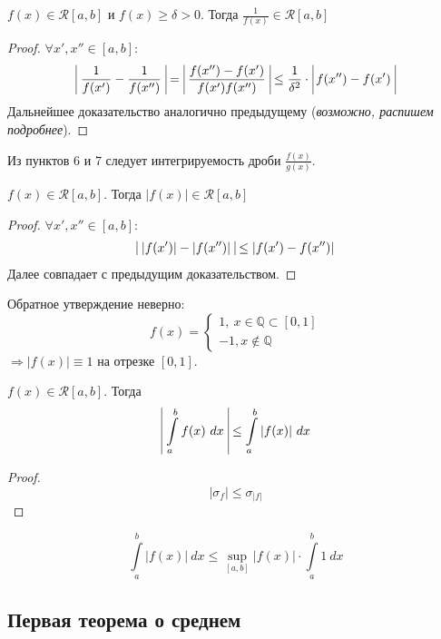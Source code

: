\begin{numtheorem}
    $f(x) \in \mathcal{R}[a, b]$ и $f(x) \geq \delta > 0$. Тогда $\frac{1}{f(x)} \in \mathcal{R}[a, b]$
\end{numtheorem}
\begin{proof}
    $\forall x', x'' \in [a, b]$:
    \begin{align*}
        \vline\ \frac{1}{f(x')} - \frac{1}{f(x'')}\ \vline =\ \vline \frac{f(x'') - f(x')}{f(x')f(x'')}\ \vline \leq \frac{1}{\delta^2}\cdot\ \vline f(x'')-f(x')\ \vline
    \end{align*}
    Дальнейшее доказательство аналогично предыдущему (\textit{возможно, распишем подробнее}).
\end{proof}
\begin{consequense}
    Из пунктов 6 и 7 следует интегрируемость дроби $\frac{f(x)}{g(x)}$.
\end{consequense}
\begin{numtheorem}
    $f(x) \in \mathcal{R}[a, b]$. Тогда $|f(x)| \in \mathcal{R}[a, b]$
\end{numtheorem}
\begin{proof}
    $\forall x', x'' \in [a, b]$:
    \begin{align*}
        \vline\ |f(x')| - |f(x'')|\ \vline \leq |f(x')-f(x'')|
    \end{align*}
    Далее совпадает с предыдущим доказательством.
\end{proof}
\begin{comm}
    Обратное утверждение неверно:
    \[f(x) = \begin{cases}
        1, \ x\in\mathbb{Q}\subset [0, 1]\\
        -1, x\notin\mathbb{Q}
    \end{cases}\]
    $\Rightarrow |f(x)| \equiv 1$ на отрезке $[0, 1]$.
\end{comm}
\begin{numtheorem}
    $f(x) \in \mathcal{R}[a, b]$. Тогда 
    \[\vline\ \int\limits_{a}^{b}f(x)\ dx\ \vline\leq \int\limits_{a}^{b} |f(x)|\ dx\]
\end{numtheorem}
\begin{proof}
    \[|\sigma_f| \leq \sigma_{|f|}\]
\end{proof}
\begin{comm}
    \[\int\limits_{a}^{b}|f(x)|\ dx \leq \sup \limits_{[a, b]} |f(x)|\cdot\int\limits_{a}^{b}1\ dx\]
\end{comm}
\setcounter{thmcount}{0}
\subsection{Первая теорема о среднем}

